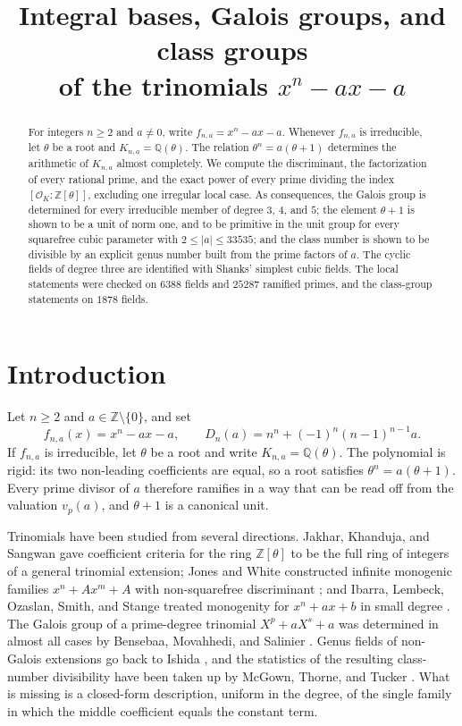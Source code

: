 \documentclass[11pt]{article}
\title{Integral bases, Galois groups, and class groups\\
of the trinomials $x^{n}-ax-a$}
\author{}
\date{}
\theoremstyle{definition}
\theoremstyle{remark}
\newcommand{\Z}{\mathbb{Z}}
\newcommand{\Q}{\mathbb{Q}}
\newcommand{\OK}{\mathcal{O}_K}
\begin{document}
\maketitle

\begin{abstract}
For integers $n\ge 2$ and $a\neq 0$, write $f_{n,a}=x^{n}-ax-a$. Whenever $f_{n,a}$
is irreducible, let $\theta$ be a root and $K_{n,a}=\Q(\theta)$. The relation
$\theta^{n}=a(\theta+1)$ determines the arithmetic of $K_{n,a}$ almost completely.
We compute the discriminant, the factorization of every rational prime, and the
exact power of every prime dividing the index $[\OK:\Z[\theta]]$, excluding one
irregular local case. As consequences, the Galois group is determined for every
irreducible member of degree $3$, $4$, and $5$; the element $\theta+1$ is shown
to be a unit of norm one, and to be primitive in the unit group for every
squarefree cubic parameter with $2\le|a|\le 33535$; and the class number is shown
to be divisible by an explicit genus number built from the prime factors of $a$.
The cyclic fields of degree three are identified with Shanks' simplest cubic
fields. The local statements were checked on $6388$ fields and $25287$ ramified
primes, and the class-group statements on $1878$ fields.
\end{abstract}

\section{Introduction}

Let $n\ge 2$ and $a\in\Z\setminus\{0\}$, and set
\[
f_{n,a}(x)=x^{n}-ax-a,\qquad D_n(a)=n^{n}+(-1)^{n}(n-1)^{n-1}a.
\]
If $f_{n,a}$ is irreducible, let $\theta$ be a root and write $K_{n,a}=\Q(\theta)$.
The polynomial is rigid: its two non-leading coefficients are equal, so a root
satisfies $\theta^{n}=a(\theta+1)$. Every prime divisor of $a$ therefore ramifies
in a way that can be read off from the valuation $v_p(a)$, and $\theta+1$ is a
canonical unit.

Trinomials have been studied from several directions. Jakhar, Khanduja, and
Sangwan gave coefficient criteria for the ring $\Z[\theta]$ to be the full ring
of integers of a general trinomial extension; Jones and White constructed
infinite monogenic families $x^{n}+Ax^{m}+A$ with non-squarefree discriminant
\cite{JW}; and Ibarra, Lembeck, Ozaslan, Smith, and Stange treated monogenity for
$x^{n}+ax+b$ in small degree \cite{ILOSS}. The Galois group of a prime-degree
trinomial $X^{p}+aX^{s}+a$ was determined in almost all cases by Bensebaa,
Movahhedi, and Salinier \cite{BMS}. Genus fields of non-Galois extensions go back
to Ishida \cite{Ish75,Ish76}, and the statistics of the resulting class-number
divisibility have been taken up by McGown, Thorne, and Tucker \cite{MTT}. What is
missing is a closed-form description, uniform in the degree, of the single family
in which the middle coefficient equals the constant term.
\end{document}
